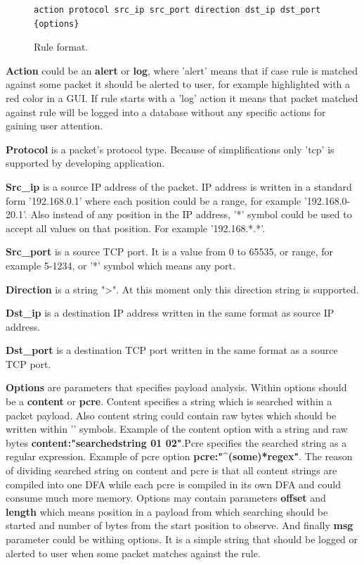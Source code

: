 \documentclass[thesis=M,english]{FITthesis}[2011/07/15]
\begin{document}
\begin{figure}[h]
\centering
\begin{verbatim}
action protocol src_ip src_port direction dst_ip dst_port {options}
\end{verbatim}
\caption{Rule format.}
\label{fig:rule_format}
\end{figure}

\textbf{Action} could be an \textbf{alert} or \textbf{log}, where 'alert' means that if case rule is matched against some packet it should be alerted to user, for example highlighted with a red color in a GUI. If rule starts with a 'log' action it means that packet matched against rule will be logged into a database without any specific actions for gaining user attention.

\textbf{Protocol} is a packet's protocol type. Because of simplifications only 'tcp' is supported by developing application.

\textbf{Src\_ip} is a source IP address of the packet. IP address is written in a standard form '192.168.0.1' where each position could be a range, for example '192.168.0-20.1'. Also instead of any position in the IP address, '*' symbol could be used to accept all values on that position. For example '192.168.*.*'.

\textbf{Src\_port} is a source TCP port. It is a value from 0 to 65535, or range, for example 5-1234, or '*' symbol which means any port.

\textbf{Direction} is a string "\textendash\textgreater". At this moment only this direction string is supported.

\textbf{Dst\_ip} is a destination IP address written in the same format as source IP address.

\textbf{Dst\_port} is a destination TCP port written in the same format as a source TCP port.

\textbf{Options} are parameters that specifies payload analysis. Within options should be a \textbf{content} or \textbf{pcre}. Content specifies a string which is searched within a packet payload. Also content string could contain raw bytes which should be written within '\textbar' symbols. Example of the content option with a string and raw bytes \textbf{content:"searchedstring 01 02\textbar"}.\newline Pcre specifies the searched string as a regular expression. Example of pcre option \textbf{pcre:"\textasciicircum(some)*regex"}. The reason of dividing searched string on content and pcre is that all content strings are compiled into one DFA while each pcre is compiled in its own DFA and could consume much more memory. Options may contain parameters \textbf{offset} and \textbf{length} which means position in a payload from which searching should be started and number of bytes from the start position to observe. And finally \textbf{msg} parameter could be withing options. It is a simple string that should be logged or alerted to user when some packet matches against the rule.
\end{document}

